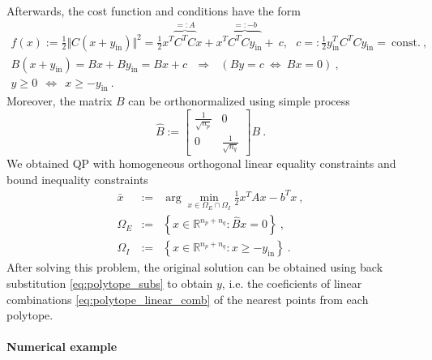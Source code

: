 \documentclass{article}
\theoremstyle{definition}
\begin{document}
Afterwards, the cost function and conditions have the form
\begin{displaymath}
 \begin{array}{l}
  f(x) := \frac{1}{2} \Vert C(x + y_{\mathrm{in}}) \Vert^2 = \frac{1}{2} x^T \overbrace{C^T C}^{=: A} x + x^T \overbrace{C^T C y_{\mathrm{in}}}^{=: - b} + ~c, ~~~ c =: \frac{1}{2} y_{\mathrm{in}}^T C^T C y_{\mathrm{in}} = ~\mathrm{const.} ~\mathrm{,}\\
  B(x + y_{\mathrm{in}}) = Bx + B y_{\mathrm{in}} = Bx + c ~~~ \Rightarrow ~~~ ( By = c ~ \Leftrightarrow ~ Bx = 0) ~\mathrm{,} \\
  y \geq 0 ~~ \Leftrightarrow ~~ x \geq - y_{\mathrm{in}}  ~\mathrm{.}
 \end{array}
\end{displaymath}
Moreover, the matrix $B$ can be orthonormalized using simple process
\begin{displaymath}
 \hat{B} := 
 \left[
  \begin{array}{cc}
   \frac{1}{\sqrt{n_p}} & 0 \\
   0 & \frac{1}{\sqrt{n_q}}
  \end{array}
 \right] 
 B  ~\mathrm{.}
\end{displaymath}
We obtained QP with homogeneous orthogonal linear equality constraints and bound inequality constraints
\begin{equation}
 \label{eq:polytope_problem3}
 \begin{array}{rcl}
  \bar{x} & := & \arg \min\limits_{x \in \Omega_E \cap \Omega_I} \frac{1}{2} x^T A x - b^T x ~\mathrm{,} \\
  \Omega_E & := & \left\lbrace x \in \mathbb{R}^{n_p + n_q}: \hat{B}x = 0 \right\rbrace ~\mathrm{,} \\
  \Omega_I & := & \left\lbrace x \in \mathbb{R}^{n_p + n_q}: x \geq -y_{\mathrm{in}} \right\rbrace ~\mathrm{.}
 \end{array}
\end{equation}
After solving this problem, the original solution can be obtained using back substitution \eqref{eq:polytope_subs} to obtain $y$, i.e. the coeficients of linear combinations \eqref{eq:polytope_linear_comb} of the nearest points from each polytope.


\paragraph{Numerical example}
\end{document}
